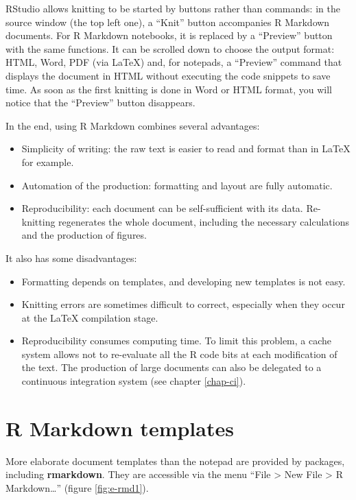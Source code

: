 \documentclass[
  12pt,
  american,
  a4paper,
  extrafontsizes,onecolumn,openright
  ]{memoir}
\providecommand{\tightlist}{%
  \setlength{\itemsep}{0pt}\setlength{\parskip}{0pt}}
\begin{document}
RStudio allows knitting to be started by buttons rather than commands: in the source window (the top left one), a \enquote{Knit} button accompanies R Markdown documents.
For R Markdown notebooks, it is replaced by a \enquote{Preview} button with the same functions.
It can be scrolled down to choose the output format: HTML, Word, PDF (via LaTeX) and, for notepads, a \enquote{Preview} command that displays the document in HTML without executing the code snippets to save time.
As soon as the first knitting is done in Word or HTML format, you will notice that the \enquote{Preview} button disappears.

In the end, using R Markdown combines several advantages:

\begin{itemize}
\tightlist
\item
  Simplicity of writing: the raw text is easier to read and format than in LaTeX for example.
\item
  Automation of the production: formatting and layout are fully automatic.
\item
  Reproducibility: each document can be self-sufficient with its data. Re-knitting regenerates the whole document, including the necessary calculations and the production of figures.
\end{itemize}

It also has some disadvantages:

\begin{itemize}
\tightlist
\item
  Formatting depends on templates, and developing new templates is not easy.
\item
  Knitting errors are sometimes difficult to correct, especially when they occur at the LaTeX compilation stage.
\item
  Reproducibility consumes computing time.
  To limit this problem, a cache system allows not to re-evaluate all the R code bits at each modification of the text.
  The production of large documents can also be delegated to a continuous integration system (see chapter \ref{chap-ci}).
\end{itemize}

\hypertarget{r-markdown-templates}{%
\section{R Markdown templates}\label{r-markdown-templates}}

More elaborate document templates than the notepad are provided by packages, including \textbf{rmarkdown}.
They are accessible via the menu \enquote{File \textgreater{} New File \textgreater{} R Markdown\ldots{}} (figure \ref{fig:e-rmd1}).
\end{document}

